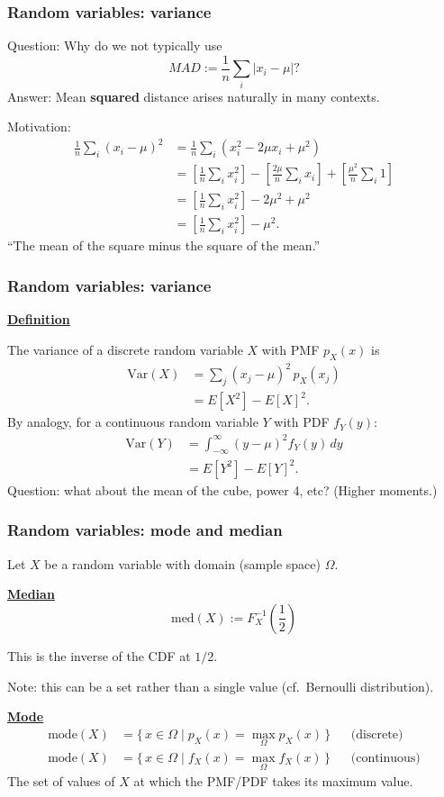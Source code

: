 \documentclass[t,8pt]{beamer}
\begin{document}
	\begin{frame}
		\frametitle{Random variables: variance}
		Question: Why do we not typically use
		\[
		MAD := \frac{1}{n}\sum_i |x_i-\mu|?
		\]
		Answer: Mean {\bf squared} distance arises naturally in many contexts. \par
		Motivation:
		\begin{align*}
			\frac{1}{n}\sum_i (x_i-\mu)^2
			&= \frac{1}{n}\sum_i (x_i^2 - 2\mu x_i + \mu^2) \\
			&= \left[\frac{1}{n}\sum_i x_i^2\right]
			- \left[\frac{2\mu}{n}\sum_i x_i\right]
			+ \left[\frac{\mu^2}{n}\sum_i 1\right] \\
			&= \left[\frac{1}{n}\sum_i x_i^2\right] - 2\mu^2 + \mu^2 \\
			&= \left[\frac{1}{n}\sum_i x_i^2\right] - \mu^2.
		\end{align*}
		{\small\color{NavyBlue} ``The mean of the square minus the square of the mean.''}
	\end{frame}
	
	\begin{frame}
		\frametitle{Random variables: variance}
		{\bf\underline{Definition}} \par
		The variance of a discrete random variable $X$ with PMF $p_X(x)$ is
		\begin{align*}
			\mathrm{Var}(X)
			&= \sum_j (x_j-\mu)^2\,p_X(x_j) \\
			&= E[X^2] - E[X]^2.
		\end{align*}
		By analogy, for a continuous random variable $Y$ with PDF $f_Y(y)$:
		\begin{align*}
			\mathrm{Var}(Y)
			&= \int_{-\infty}^{\infty} (y-\mu)^2 f_Y(y)\,dy \\
			&= E[Y^2] - E[Y]^2.
		\end{align*}
		Question: what about the mean of the cube, power 4, etc? (Higher moments.)
	\end{frame}
	
	\begin{frame}
		\frametitle{Random variables: mode and median}
		Let $X$ be a random variable with domain (sample space) $\Omega$. \par
		{\bf\underline{Median}}
		\[
		\mathrm{med}(X) := F_X^{-1}\!\left(\frac{1}{2}\right)
		\]
		{\small\color{NavyBlue}
			This is the inverse of the CDF at $1/2$. \par
			Note: this can be a set rather than a single value (cf.\ Bernoulli distribution).} \par
		{\bf\underline{Mode}}
		\begin{align*}
			\mathrm{mode}(X)
			&= \{\,x\in\Omega \mid p_X(x) = \max_{\Omega} p_X(x)\,\}
			&& \text{(discrete)}\\
			\mathrm{mode}(X)
			&= \{\,x\in\Omega \mid f_X(x) = \max_{\Omega} f_X(x)\,\}
			&& \text{(continuous)}
		\end{align*}
		{\small\color{NavyBlue} The set of values of $X$ at which the PMF/PDF takes its maximum value.}
	\end{frame}
	
\end{document}
